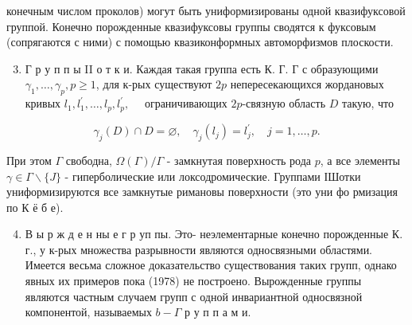 \documentclass[10pt]{article}
\begin{document}
конечным числом проколов) могут быть униформизированы одной квазифуксовой группой. Конечно порожденные квазифуксовы группы сводятся к фуксовым (сопрягаются с ними) с помощью квазиконформных автоморфизмов плоскости.



\begin{enumerate}

  \setcounter{enumi}{2}

  \item Г р у п п ы II о т к и. Каждая такая группа есть К. Г. Г с образующими $\gamma_{1}, \ldots, \gamma_{p}, p \geqslant 1$, для к-рых существуют $2 p$ непересекающихся жордановых кривых $l_{1}, l_{1}^{\prime}, \ldots, l_{p}, l_{p}^{\prime}, \quad$ ограничивающих $2 p$-связную область $D$ такую, что

\end{enumerate}



\[

\gamma_{j}(D) \cap D=\varnothing, \quad \gamma_{j}\left(l_{j}\right)=l_{j}^{\prime}, \quad j=1, \ldots, p .

\]



При этом $\Gamma$ свободна, $\Omega(\Gamma) / \Gamma$ - замкнутая поверхность рода $p$, а все элементы $\gamma \in \Gamma \backslash\{J\}$ - гиперболические или локсодромические. Группами ІШотки униформизируются все замкнутые римановы поверхности (это уни фо рмизация по К ё б е).



\begin{enumerate}

  \setcounter{enumi}{3}

  \item В ы р ж д е н ны е г р уп пы. Это- неэлементарные конечно порожденные К. г., у к-рых множества разрывности являются односвязными областями. Имеется весьма сложное доказательство существования таких групп, однако явных их примеров пока (1978) не построено. Вырожденные группы являются частным случаем групп с одной инвариантной односвязной компонентой, называемых $b-\Gamma$ р у п п а м и.

\end{enumerate}
\end{document}
